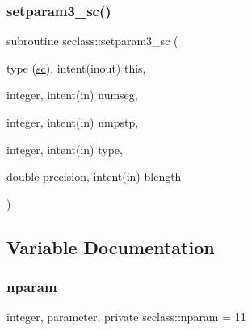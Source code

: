 \mbox{\label{namespacescclass_a656d4cc4d5fe872ffa9df12bab721bec}} 
\subsubsection{\texorpdfstring{setparam3\_sc()}{setparam3\_sc()}}
{\footnotesize\ttfamily subroutine scclass\+::setparam3\+\_\+sc (\begin{DoxyParamCaption}\item[{type (\mbox{\hyperlink{namespacescclass_structscclass_1_1sc}{sc}}), intent(inout)}]{this,  }\item[{integer, intent(in)}]{numseg,  }\item[{integer, intent(in)}]{nmpstp,  }\item[{integer, intent(in)}]{type,  }\item[{double precision, intent(in)}]{blength }\end{DoxyParamCaption})}



\subsection{Variable Documentation}
\mbox{\label{namespacescclass_a78eec9a89964d83818db291873df4436}} 
\subsubsection{\texorpdfstring{nparam}{nparam}}
{\footnotesize\ttfamily integer, parameter, private scclass\+::nparam = 11\hspace{0.3cm}{\ttfamily [private]}}

